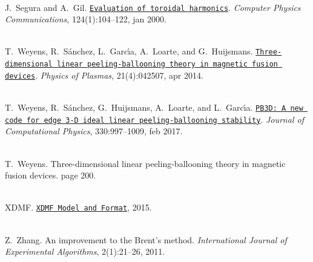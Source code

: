 \begin{DoxyDescription}
\item[{\parbox[t]{\linewidth}{\label{citelist_CITEREF_segura2000}%
\Hypertarget{citelist_CITEREF_segura2000}%
\+[12]}}]\hfill \\
J.~Segura and A.~Gil. \href{http://linkinghub.elsevier.com/retrieve/pii/S0010465599004282 https://ptp.jinr.ru/programs/cpc_ind8/ADKV.html http://cpc.cs.qub.ac.uk/summaries/ADKV_v1_0.html}{\texttt{Evaluation of toroidal harmonics}}. {\itshape Computer Physics Communications}, 124(1):104--122, jan 2000. 


\item[{\parbox[t]{\linewidth}{\label{citelist_CITEREF_weyens2014theory}%
\Hypertarget{citelist_CITEREF_weyens2014theory}%
\+[13]}}]\hfill \\
T.~Weyens, R.~S\'{a}nchez, L.~Garc\'{\i}a, A.~Loarte, and G.~Huijsmans. \href{http://aip.scitation.org/doi/10.1063/1.4871859}{\texttt{Three-\/dimensional linear peeling-\/ballooning theory in magnetic fusion devices}}. {\itshape Physics of Plasmas}, 21(4):042507, apr 2014. 


\item[{\parbox[t]{\linewidth}{\label{citelist_CITEREF_weyens2017pb3d}%
\Hypertarget{citelist_CITEREF_weyens2017pb3d}%
\+[14]}}]\hfill \\
T.~Weyens, R.~S\'{a}nchez, G.~Huijsmans, A.~Loarte, and L.~Garc\'{\i}a. \href{http://linkinghub.elsevier.com/retrieve/pii/S0021999116305629}{\texttt{PB3\+D: A new code for edge 3-\/D ideal linear peeling-\/ballooning stability}}. {\itshape Journal of Computational Physics}, 330:997--1009, feb 2017. 


\item[{\parbox[t]{\linewidth}{\label{citelist_CITEREF_weyens3d}%
\Hypertarget{citelist_CITEREF_weyens3d}%
\+[15]}}]\hfill \\
T.~Weyens. Three-\/dimensional linear peeling-\/ballooning theory in magnetic fusion devices. page 200.


\item[{\parbox[t]{\linewidth}{\label{citelist_CITEREF_xdmf}%
\Hypertarget{citelist_CITEREF_xdmf}%
\+[16]}}]\hfill \\
XDMF. \href{http://www.xdmf.org/index.php/XDMF_Model_and_Format}{\texttt{XDMF Model and Format}}, 2015.


\item[{\parbox[t]{\linewidth}{\label{citelist_CITEREF_zhang2011improvement}%
\Hypertarget{citelist_CITEREF_zhang2011improvement}%
\+[17]}}]\hfill \\
Z.~Zhang. An improvement to the Brent's method. {\itshape International Journal of Experimental Algorithms}, 2(1):21--26, 2011.


\end{DoxyDescription}